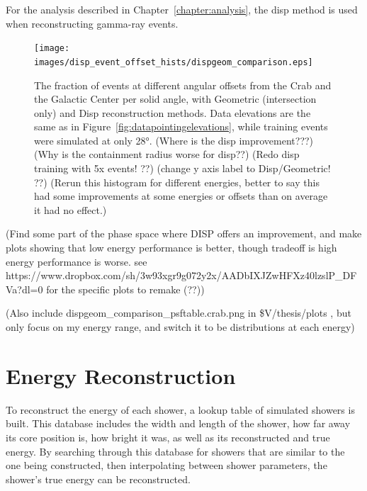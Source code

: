     For the analysis described in Chapter~\ref{chapter:analysis}, the disp method is used when reconstructing gamma-ray events.

    \begin{figure}[ht]
      \centering
      \texttt{[image: images/disp\_event\_offset\_hists/dispgeom\_comparison.eps]}
      \caption[DISP Offset Improvement]{
        The fraction of events at different angular offsets from the Crab and the Galactic Center per solid angle, with Geometric (intersection only) and Disp reconstruction methods.
        Data elevations are the same as in Figure~\ref{fig:datapointingelevations}, while training events were simulated at only \ang{28}.
        {\color{red}(Where is the disp improvement???)}
        {\color{red}(Why is the containment radius worse for disp??)}
        {\color{red}(Redo disp training with 5x events! ??)}
        {\color{red}(change y axis label to Disp/Geometric! ??)}
        {\color{red}(Rerun this histogram for different energies, better to say this had some improvements at some energies or offsets than on average it had no effect.)}
      }
      \label{fig:disp_event_offset}
    \end{figure}
  
  {\color{red}(Find some part of the phase space where DISP offers an improvement, and make plots showing that low energy performance is better, though tradeoff is high energy performance is worse. see https://www.dropbox.com/sh/3w93xgr9g072y2x/AADbIXJZwHFXz40lzslP\_DFVa?dl=0 for the specific plots to remake (??))}
  
  {\color{red}(Also include dispgeom\_comparison\_psftable.crab.png in \$V/thesis/plots , but only focus on my energy range, and switch it to be distributions at each energy)}

  
  \FloatBarrier

\section{Energy Reconstruction}\label{subsec:enrecon}
  To reconstruct the energy of each shower, a lookup table of simulated showers is built.
This database includes the width and length of the shower, how far away its core position is, how bright it was, as well as its reconstructed and true energy.
  By searching through this database for showers that are similar to the one being constructed, then interpolating between shower parameters, the shower's true energy can be reconstructed.


